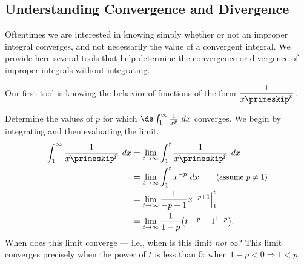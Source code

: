 \subsection{Understanding Convergence and Divergence}

Oftentimes we are interested in knowing simply whether or not an improper integral converges, and not necessarily the value of a convergent integral. We provide here several tools that help determine the convergence or divergence of improper integrals without integrating.

Our first tool is knowing the behavior of functions of the form $\dfrac1{x\primeskip^p}$.

\begin{example}\label{ex_impint4}
Determine the values of $p$ for which $\ds \int_1^\infty \frac1{x^p}\ dx$ converges.
\solution
We begin by integrating and then evaluating the limit.
\begin{align*}
	\int_1^\infty \frac1{x\primeskip^p}\ dx
	&= \lim_{t\to\infty}\int_1^t\frac1{x\primeskip^p}\ dx\\
	&= \lim_{t\to\infty}\int_1^t x^{-p}\ dx \qquad \text{\small (assume $p\neq 1$)}\\
	&= \lim_{t\to\infty} \frac{1}{-p+1}x^{-p+1}\Big|_1^t\\
	&= \lim_{t\to\infty} \frac{1}{1-p}\bigl(t^{1-p}-1^{1-p}\bigr).\\
\end{align*}
%
%
%
When does this limit converge --- i.e., when is this limit \emph{not} $\infty$? This limit converges precisely when the power of $t$ is less than 0: when $1-p<0 \Rightarrow 1<p$. 


\end{example}
